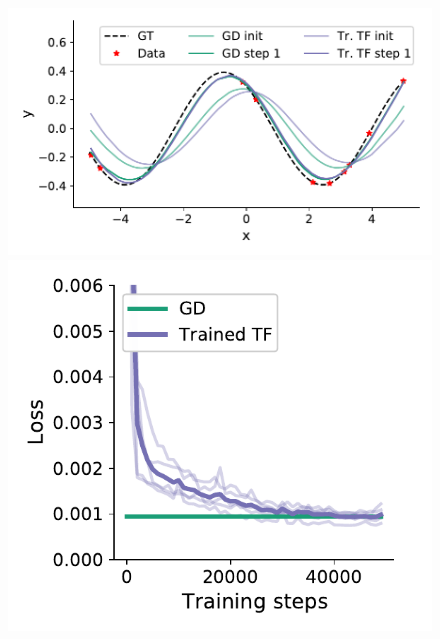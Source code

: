 \documentclass{article}
\theoremstyle{plain}
\theoremstyle{definition}
\theoremstyle{remark}
\begin{document}
\begin{figure}
\vspace{-7pt}
\begin{center}
\begin{minipage}{.36\textwidth}
  \centering
  \begin{center}
    \includegraphics[width=1.\textwidth]{Final_figures/non_linear/sine_wave.pdf}
  \end{center}
\end{minipage}
\hspace{20pt}
\begin{minipage}{.24\textwidth}
  \centering
  \begin{center}
    \includegraphics[width=1.\textwidth]{Final_figures/non_linear/train.pdf}
  \end{center}

\end{minipage}
\end{center}
\end{figure}
\end{document}
